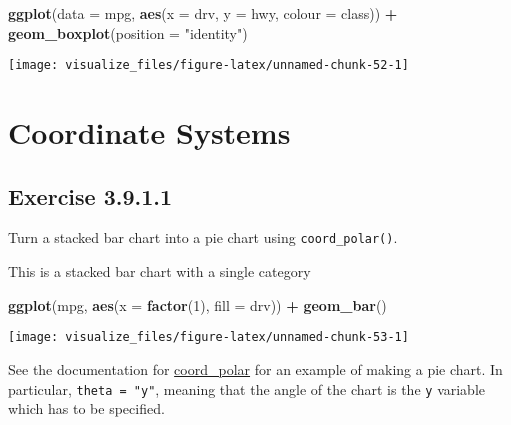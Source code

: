 \documentclass[]{book}
\newenvironment{Shaded}{\begin{snugshade}}{\end{snugshade}}
\newcommand{\DataTypeTok}[1]{\textcolor[rgb]{0.13,0.29,0.53}{#1}}
\newcommand{\DecValTok}[1]{\textcolor[rgb]{0.00,0.00,0.81}{#1}}
\newcommand{\KeywordTok}[1]{\textcolor[rgb]{0.13,0.29,0.53}{\textbf{#1}}}
\newcommand{\NormalTok}[1]{#1}
\newcommand{\OperatorTok}[1]{\textcolor[rgb]{0.81,0.36,0.00}{\textbf{#1}}}
\newcommand{\StringTok}[1]{\textcolor[rgb]{0.31,0.60,0.02}{#1}}
\theoremstyle{plain}
\theoremstyle{remark}
\begin{document}
\begin{Shaded}
\begin{Highlighting}[]
\KeywordTok{ggplot}\NormalTok{(}\DataTypeTok{data =}\NormalTok{ mpg, }\KeywordTok{aes}\NormalTok{(}\DataTypeTok{x =}\NormalTok{ drv, }\DataTypeTok{y =}\NormalTok{ hwy, }\DataTypeTok{colour =}\NormalTok{ class)) }\OperatorTok{+}
\StringTok{  }\KeywordTok{geom_boxplot}\NormalTok{(}\DataTypeTok{position =} \StringTok{"identity"}\NormalTok{)}
\end{Highlighting}
\end{Shaded}

\begin{center}\texttt{[image: visualize\_files/figure-latex/unnamed-chunk-52-1]} \end{center}

\hypertarget{coordinate-systems}{%
\section{Coordinate Systems}\label{coordinate-systems}}

\hypertarget{exercise-3.9.1.1}{%
\subsection*{\texorpdfstring{Exercise
{3.9.1.1}}{Exercise 3.9.1.1}}\label{exercise-3.9.1.1}}

Turn a stacked bar chart into a pie chart using \texttt{coord\_polar()}.

This is a stacked bar chart with a single category

\begin{Shaded}
\begin{Highlighting}[]
\KeywordTok{ggplot}\NormalTok{(mpg, }\KeywordTok{aes}\NormalTok{(}\DataTypeTok{x =} \KeywordTok{factor}\NormalTok{(}\DecValTok{1}\NormalTok{), }\DataTypeTok{fill =}\NormalTok{ drv)) }\OperatorTok{+}
\StringTok{  }\KeywordTok{geom_bar}\NormalTok{()}
\end{Highlighting}
\end{Shaded}

\begin{center}\texttt{[image: visualize\_files/figure-latex/unnamed-chunk-53-1]} \end{center}

See the documentation for
\href{https://ggplot2.tidyverse.org/reference/coord_polar.html}{coord\_polar}
for an example of making a pie chart. In particular,
\texttt{theta\ =\ "y"}, meaning that the angle of the chart is the
\texttt{y} variable which has to be specified.
\end{document}
